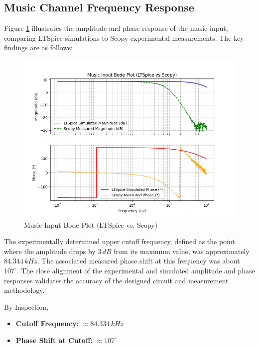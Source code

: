 \documentclass[12pt]{article}
\begin{document}
\subsection{Music Channel Frequency Response}

Figure \ref{fig:music_bode} illustrates the amplitude and phase response of the music input, comparing LTSpice simulations to Scopy experimental measurements. The key findings are as follows:

\begin{figure}[H]
	\centering
	\includegraphics[width=1.0\textwidth]{dp_music}
	\caption{Music Input Bode Plot (LTSpice vs. Scopy)}
	\label{fig:music_bode}
\end{figure}

The experimentally determined upper cutoff frequency, defined as the point where
the amplitude drops by $3\,dB$ from its maximum value, was approximately
$84.344\,kHz$. The associated measured phase shift at this frequency was about
$107^\circ$. The close alignment of the experimental and simulated amplitude and phase responses validates the accuracy of the designed circuit and measurement methodology.

By Inspection,
\begin{itemize}
	\item \textbf{Cutoff Frequency:} $\approx 84.334\,kHz$
	\item \textbf{Phase Shift at Cutoff:} $\approx 107^\circ$
\end{itemize}
\end{document}
